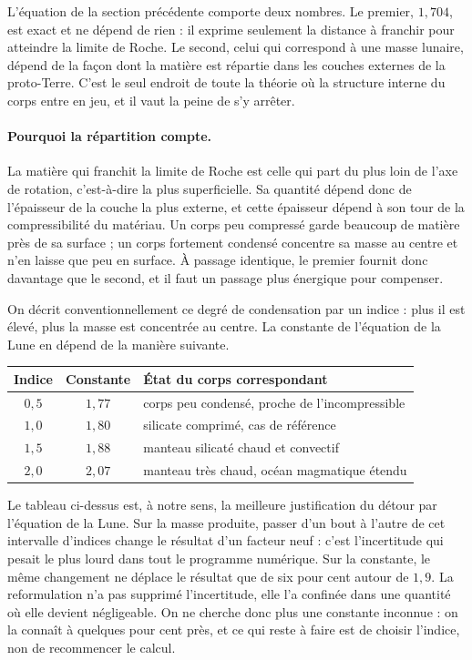\documentclass[11pt,a4paper,openany]{report}
\begin{document}
L'équation de la section précédente comporte deux nombres. Le premier, $1{,}704$, est exact et ne
dépend de rien : il exprime seulement la distance à franchir pour atteindre la limite de Roche. Le
second, celui qui correspond à une masse lunaire, dépend de la façon dont la matière est répartie
dans les couches externes de la proto-Terre. C'est le seul endroit de toute la théorie où la
structure interne du corps entre en jeu, et il vaut la peine de s'y arrêter.

\paragraph{Pourquoi la répartition compte.} La matière qui franchit la limite de Roche est celle
qui part du plus loin de l'axe de rotation, c'est-à-dire la plus superficielle. Sa quantité dépend
donc de l'épaisseur de la couche la plus externe, et cette épaisseur dépend à son tour de la
compressibilité du matériau. Un corps peu compressé garde beaucoup de matière près de sa surface ;
un corps fortement condensé concentre sa masse au centre et n'en laisse que peu en surface. À
passage identique, le premier fournit donc davantage que le second, et il faut un passage plus
énergique pour compenser.

On décrit conventionnellement ce degré de condensation par un indice : plus il est élevé, plus la
masse est concentrée au centre. La constante de l'équation de la Lune en dépend de la manière
suivante.

\begin{center}
\begin{tabular}{ccl}
\toprule
\textbf{Indice} & \textbf{Constante} & \textbf{État du corps correspondant} \\
\midrule
$0{,}5$ & $1{,}77$ & corps peu condensé, proche de l'incompressible \\
$1{,}0$ & $1{,}80$ & silicate comprimé, cas de référence \\
$1{,}5$ & $1{,}88$ & manteau silicaté chaud et convectif \\
$2{,}0$ & $2{,}07$ & manteau très chaud, océan magmatique étendu \\
\bottomrule
\end{tabular}
\end{center}

\begin{ideephys}
Le tableau ci-dessus est, à notre sens, la meilleure justification du détour par l'équation de la
Lune. Sur la masse produite, passer d'un bout à l'autre de cet intervalle d'indices change le
résultat d'un facteur neuf : c'est l'incertitude qui pesait le plus lourd dans tout le programme
numérique. Sur la constante, le même changement ne déplace le résultat que de six pour cent autour
de $1{,}9$. La reformulation n'a pas supprimé l'incertitude, elle l'a confinée dans une quantité où
elle devient négligeable. On ne cherche donc plus une constante inconnue : on la connaît à quelques
pour cent près, et ce qui reste à faire est de choisir l'indice, non de recommencer le calcul.
\end{ideephys}
\end{document}
